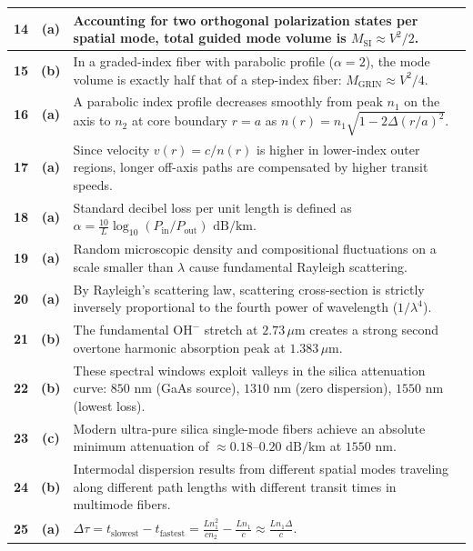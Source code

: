 {\begin{tabularx}{\textwidth}{|c|c|X|}
\textbf{14} & \textbf{(a)} & Accounting for two orthogonal polarization states per spatial mode, total guided mode volume is $M_{\text{SI}} \approx V^2/2$. \\ \hline
\textbf{15} & \textbf{(b)} & In a graded-index fiber with parabolic profile ($\alpha=2$), the mode volume is exactly half that of a step-index fiber: $M_{\text{GRIN}} \approx V^2/4$. \\ \hline
\textbf{16} & \textbf{(a)} & A parabolic index profile decreases smoothly from peak $n_1$ on the axis to $n_2$ at core boundary $r=a$ as $n(r) = n_1\sqrt{1-2\Delta(r/a)^2}$. \\ \hline
\textbf{17} & \textbf{(a)} & Since velocity $v(r) = c/n(r)$ is higher in lower-index outer regions, longer off-axis paths are compensated by higher transit speeds. \\ \hline
\textbf{18} & \textbf{(a)} & Standard decibel loss per unit length is defined as $\alpha = \frac{10}{L}\log_{10}(P_{\text{in}}/P_{\text{out}})\text{ dB/km}$. \\ \hline
\textbf{19} & \textbf{(a)} & Random microscopic density and compositional fluctuations on a scale smaller than $\lambda$ cause fundamental Rayleigh scattering. \\ \hline
\textbf{20} & \textbf{(a)} & By Rayleigh's scattering law, scattering cross-section is strictly inversely proportional to the fourth power of wavelength ($1/\lambda^4$). \\ \hline
\textbf{21} & \textbf{(b)} & The fundamental $\text{OH}^-$ stretch at $2.73\,\mu\text{m}$ creates a strong second overtone harmonic absorption peak at $1.383\,\mu\text{m}$. \\ \hline
\textbf{22} & \textbf{(b)} & These spectral windows exploit valleys in the silica attenuation curve: $850\text{ nm}$ (GaAs source), $1310\text{ nm}$ (zero dispersion), $1550\text{ nm}$ (lowest loss). \\ \hline
\textbf{23} & \textbf{(c)} & Modern ultra-pure silica single-mode fibers achieve an absolute minimum attenuation of $\approx 0.18\text{--}0.20\text{ dB/km}$ at $1550\text{ nm}$. \\ \hline
\textbf{24} & \textbf{(b)} & Intermodal dispersion results from different spatial modes traveling along different path lengths with different transit times in multimode fibers. \\ \hline
\textbf{25} & \textbf{(a)} & $\Delta\tau = t_{\text{slowest}} - t_{\text{fastest}} = \frac{L n_1^2}{c n_2} - \frac{L n_1}{c} \approx \frac{L n_1 \Delta}{c}$. \\ \hline
\end{tabularx}
}

